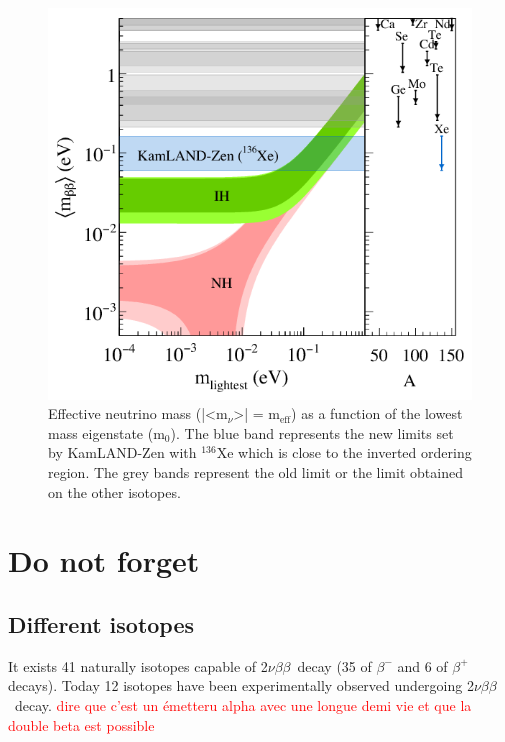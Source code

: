 \documentclass[main.tex]{subfiles}
\begin{document}
\begin{figure}[h!]
\begin{center}
\includegraphics[scale=0.60]{pictures/Chap2/KamLAND-Zen-results.png}
\caption{Effective neutrino mass (|<m$_{\nu}$>| = m$_{\text{eff}}$) as a function of the lowest mass eigenstate (m$_\text{0}$). The blue band represents the new limits set by KamLAND-Zen with $^{\text{136}}$Xe which is close to the inverted ordering region. The grey bands represent the old limit or the limit obtained on the other isotopes.}
\label{KamLAND-Zen-results}
\end{center}
\end{figure}

\FloatBarrier









\ifx
\section{Do not forget}
\subsection{Different isotopes}


\NI It exists 41 naturally isotopes capable of 2$\nu\beta\beta$~decay (35 of $\beta^{-}$ and 6 of $\beta^{+}$ decays). Today 12 isotopes have been experimentally observed undergoing 2$\nu\beta\beta$~decay. \textcolor{red}{dire que c'est un émetteru alpha avec une longue demi vie et que la double beta est possible}
\end{document}
